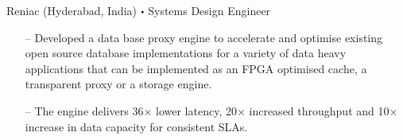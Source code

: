    {
	    Reniac (Hyderabad, India)}
    {
	    $\sbullet$ Systems Design Engineer
    }
    {
        \justify
        \begin{itemize}
            \item [--] Developed a data base proxy engine to accelerate and optimise existing open source database implementations for a variety of data heavy applications that can be implemented as an FPGA optimised cache, a transparent proxy or a storage engine. 
            \item [--] The engine delivers 36$\times$ lower latency, 20$\times$ increased throughput and 10$\times$ increase in data capacity for consistent SLAs.
        \end{itemize}
    }

